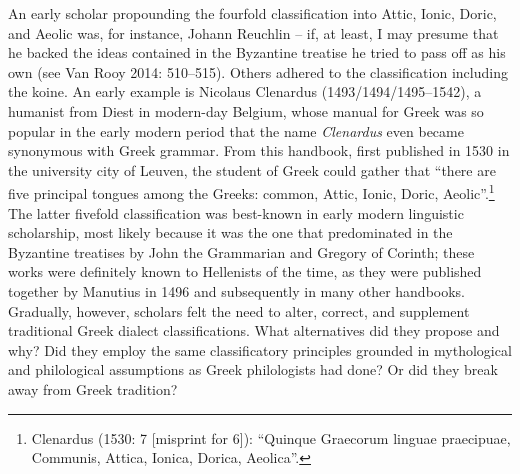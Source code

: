 \begin{styleStandard}
An early scholar propounding the fourfold classification into Attic, Ionic, Doric, and Aeolic was, for instance, Johann Reuchlin – if, at least, I may presume that he backed the ideas contained in the Byzantine treatise he tried to pass off as his own (see Van Rooy 2014: 510–515). Others adhered to the classification including the koine. An early example is Nicolaus Clenardus (1493/1494/1495–1542), a humanist from Diest in modern-day Belgium, whose manual for Greek was so popular in the early modern period that the name \textit{Clenardus} even became synonymous with Greek grammar. From this handbook, first published in 1530 in the university city of Leuven, the student of Greek could gather that “there are five principal tongues among the Greeks: common, Attic, Ionic, Doric, Aeolic”.\footnote{ Clenardus (1530: 7 [misprint for 6]): “Quinque Graecorum linguae praecipuae, Communis, Attica, Ionica, Dorica, Aeolica”.} The latter fivefold classification was best-known in early modern linguistic scholarship, most likely because it was the one that predominated in the Byzantine treatises by John the Grammarian and Gregory of Corinth; these works were definitely known to Hellenists of the time, as they were published together by Manutius in 1496 and subsequently in many other handbooks. Gradually, however, scholars felt the need to alter, correct, and supplement traditional Greek dialect classifications. What alternatives did they propose and why? Did they employ the same classificatory principles grounded in mythological and philological assumptions as Greek philologists had done? Or did they break away from Greek tradition?
\end{styleStandard}

